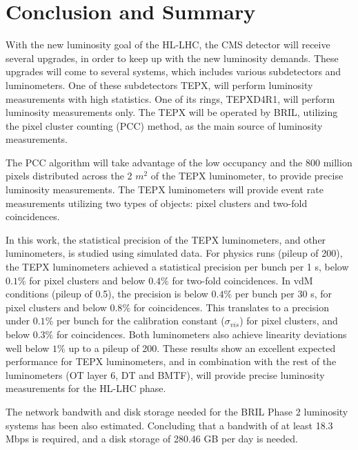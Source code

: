 \chapter{Conclusion and Summary }
With the new luminosity goal of the HL-LHC, the CMS detector will receive several upgrades, in order to keep up with the new luminosity demands. These upgrades will come to several systems, which includes various subdetectors and luminometers. One of these subdetectors TEPX,
will perform luminosity measurements with high statistics. 
One of its rings, TEPXD4R1, will perform luminosity measurements only. The TEPX will be operated by BRIL, utilizing the pixel cluster counting (PCC) method, as the main source of luminosity measurements.

The PCC algorithm will take advantage of the low occupancy and the 800 million pixels distributed across the 2 $m^2$ of the TEPX luminometer, to provide precise luminosity measurements. The TEPX luminometers will provide event rate measurements utilizing two types of objects: pixel clusters and two-fold coincidences. 

In this work, the statistical precision of the TEPX luminometers, and other luminometers, is studied using simulated data. For physics runs (pileup of 200), the TEPX luminometers achieved a statistical precision per bunch per 1 s, below $0.1\%$ for pixel clusters and below $0.4\%$ for two-fold coincidences. In vdM conditions (pileup of 0.5), the precision is below $0.4\%$ per bunch per 30 s, for pixel clusters and below $0.8\%$ for coincidences. This translates to a precision under $0.1\%$ per bunch for the calibration constant ($\sigma_{vis}$) for pixel clusters, and below $0.3\%$ for coincidences. Both luminometers also achieve linearity deviations well below $1\%$ up to a pileup of 200. 
These results show an excellent expected performance for TEPX luminometers, and in combination with the rest of the luminometers (OT layer 6, DT and BMTF), will provide precise luminosity measurements for the HL-LHC phase.

The network bandwith and disk storage needed for the BRIL Phase 2 luminosity systems has been also estimated. Concluding that a bandwith of at least 18.3 Mbps is required, and a disk storage of 280.46 GB per day is needed.